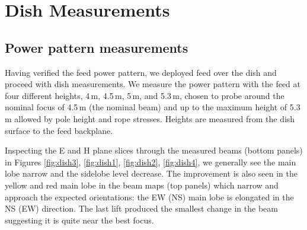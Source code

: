 \documentclass{emulateapj}
\begin{document}




\section{Dish Measurements}

\subsection{Power pattern measurements}

Having verified the feed power pattern, we deployed feed over the dish and proceed with dish measurements. We measure the power pattern with the feed at four different heights, 4\,m, 4.5\,m, 5\,m, and 5.3\,m, chosen to probe around the nominal focus of 4.5\,m (the nominal beam) and up to the maximum height of 5.3\,m allowed by pole height and rope stresses. Heights are measured from the dish surface to the feed backplane. 

Inspecting the E and H plane slices through the measured beams (bottom panels) in Figures \ref{fig:dish3}, \ref{fig:dish1}, \ref{fig:dish2}, \ref{fig:dish4}, we generally see the main lobe narrow and the sidelobe level decrease. The improvement is also seen in the yellow and red main lobe in the beam maps (top panels) which narrow and approach the expected orientations: the EW (NS) main lobe is elongated in the NS (EW) direction. The last lift produced the smallest change in the beam suggesting it is quite near the best focus. 
\end{document}
